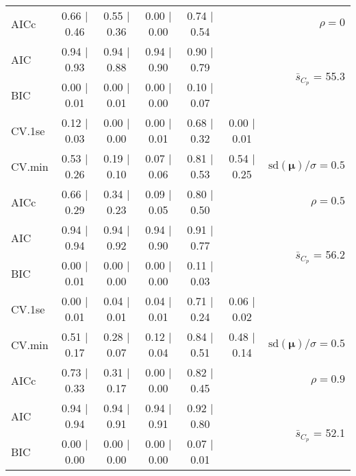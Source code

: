 \documentclass[12pt]{article}
\newcommand{\mr}[1]{\mathrm{#1}}
\newcommand{\bm}[1]{\mathbf{#1}}
\begin{document}
\begin{table}[p]
\begin{center}
\begin{tabular}{l*{5}{c}|r}
AICc & 0.66 $\mid$ 0.46 & 0.55 $\mid$ 0.36 & 0.00 $\mid$ 0.00 & 0.74 $\mid$ 0.54 & & $\rho=0$ \\
AIC & 0.94 $\mid$ 0.93 & 0.94 $\mid$ 0.88 & 0.94 $\mid$ 0.90 & 0.90 $\mid$ 0.79 & & \multirow{2}{*}{$\bar{s}_{C_p}$ = 55.3} \\
BIC & 0.00 $\mid$ 0.01 & 0.00 $\mid$ 0.01 & 0.00 $\mid$ 0.00 & 0.10 $\mid$ 0.07 & & \\
 \hline 
CV.1se & 0.12 $\mid$ 0.03 & 0.00 $\mid$ 0.00 & 0.00 $\mid$ 0.01 & 0.68 $\mid$ 0.32 & 0.00 $\mid$ 0.01 &\\
CV.min & 0.53 $\mid$ 0.26 & 0.19 $\mid$ 0.10 & 0.07 $\mid$ 0.06 & 0.81 $\mid$ 0.53 & 0.54 $\mid$ 0.25 &  $\mr{sd}(\bm{\mu})/\sigma=0.5$ \\
AICc & 0.66 $\mid$ 0.29 & 0.34 $\mid$ 0.23 & 0.09 $\mid$ 0.05 & 0.80 $\mid$ 0.50 & & $\rho=0.5$ \\
AIC & 0.94 $\mid$ 0.94 & 0.94 $\mid$ 0.92 & 0.94 $\mid$ 0.90 & 0.91 $\mid$ 0.77 & & \multirow{2}{*}{$\bar{s}_{C_p}$ = 56.2} \\
BIC & 0.00 $\mid$ 0.01 & 0.00 $\mid$ 0.00 & 0.00 $\mid$ 0.00 & 0.11 $\mid$ 0.03 & & \\
 \hline 
CV.1se & 0.00 $\mid$ 0.01 & 0.04 $\mid$ 0.01 & 0.04 $\mid$ 0.01 & 0.71 $\mid$ 0.24 & 0.06 $\mid$ 0.02 &\\
CV.min & 0.51 $\mid$ 0.17 & 0.28 $\mid$ 0.07 & 0.12 $\mid$ 0.04 & 0.84 $\mid$ 0.51 & 0.48 $\mid$ 0.14 &  $\mr{sd}(\bm{\mu})/\sigma=0.5$ \\
AICc & 0.73 $\mid$ 0.33 & 0.31 $\mid$ 0.17 & 0.00 $\mid$ 0.00 & 0.82 $\mid$ 0.45 & & $\rho=0.9$ \\
AIC & 0.94 $\mid$ 0.94 & 0.94 $\mid$ 0.91 & 0.94 $\mid$ 0.91 & 0.92 $\mid$ 0.80 & & \multirow{2}{*}{$\bar{s}_{C_p}$ = 52.1} \\
BIC & 0.00 $\mid$ 0.00 & 0.00 $\mid$ 0.00 & 0.00 $\mid$ 0.00 & 0.07 $\mid$ 0.01 & & \\
 \hline 
 \end{tabular}
\end{center}
\vspace{-1cm}
\end{table}
\end{document}
